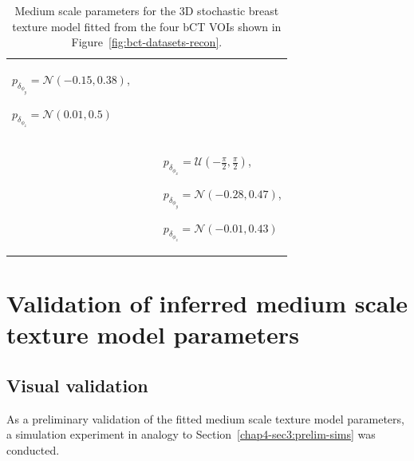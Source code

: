 \documentclass[journal]{IEEEtran}
\begin{document}
\begin{table}[!htb]
\begin{center}
\begin{tabular}{ m{1cm} m{2cm} m{2cm} m{2cm} }
        $p_{\delta_{\phi_y}} = \mathcal{N}(-0.15, 0.38)$,

        $p_{\delta_{\phi_z}} = \mathcal{N}(0.01, 0.5)$
        \tabularnewline%

      \cmidrule(lr){1-1} \cmidrule(lr){2-2}
      \cmidrule(lr){3-3} \cmidrule(lr){4-4}

      \centering{\#11}
      & \centering{$\kappa = 3.405e-03$, $\lambda_0 = 1.923e-02$,
        $R =
        3.853$}
      & \centering{$p_{L_a} = \mathcal{N}(6.06, 1.39)$,
        $p_{L_b} = \mathcal{N}(2.79, 0.56)$,
        $p_{L_c} = \mathcal{N}(2.10, 0.54)$}
      & $p_{\delta_{\phi_x}} = \mathcal{U}(-\frac{\pi}{2},
        \frac{\pi}{2})$,

        $p_{\delta_{\phi_y}} = \mathcal{N}(-0.28, 0.47)$,

        $p_{\delta_{\phi_z}} = \mathcal{N}(-0.01, 0.43)$
        \tabularnewline%

      \bottomrule

    \end{tabular}

    \caption{Medium scale parameters for the 3D stochastic breast
      texture model fitted from the four bCT VOIs shown in
      Figure~\ref{fig:bct-datasets-recon}.}
    \label{tab:summary-inferred-params}
  \end{center}
\end{table}


\section{Validation of inferred medium scale texture model parameters}
\label{sec4-sub3:simulations}

\subsection{Visual validation}
\label{sec:visual-validation}

As a preliminary validation of the fitted medium scale texture model
parameters, a simulation experiment in analogy to
Section~\ref{chap4-sec3:prelim-sims} was conducted.
\end{document}
